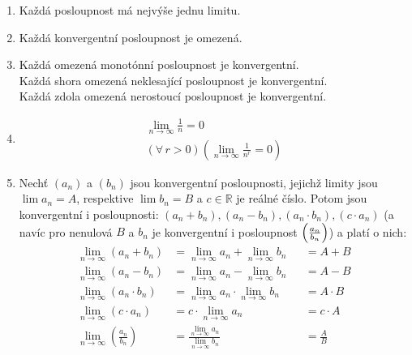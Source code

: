 \documentclass[12pt]{article}
\begin{document}
\begin{enumerate}
\item Každá posloupnost má nejvýše jednu limitu.
\item Každá konvergentní posloupnost je omezená.
\item Každá omezená monotónní posloupnost je konvergentní.\\
Každá shora omezená neklesající posloupnost je konvergentní.\\
Každá zdola omezená nerostoucí posloupnost je konvergentní.
\item
\begin{align}
\lim_{n \to \infty} \frac{1}{n} = 0\\
\left( \forall \, r>0 \right) \left( \lim_{n \to \infty} \frac{1}{n^r} = 0 \right)
\end{align}
\item Nechť $(a_n)$ a $(b_n)$ jsou konvergentní posloupnosti, jejichž limity jsou $ \lim a_n = A$, respektive $ \lim b_n = B$ a $c \in \mathbb{R}$ je reálné číslo. Potom jsou konvergentní i posloupnosti: $(a_n + b_n), (a_n - b_n), (a_n \cdot b_n), (c \cdot a_n )$  (a navíc pro nenulová $B$ a $b_n$ je konvergentní i posloupnost $\left( \small \frac{ a_n}{b_n} \right)$) a platí o nich:
\begin{align}
\lim_{n \to \infty} (a_n + b_n) &= \lim_{n \to \infty}a_n + \lim_{n \to \infty} b_n &&= A + B\\
\lim_{n \to \infty} (a_n - b_n) &= \lim_{n \to \infty}a_n - \lim_{n \to \infty} b_n &&= A - B\\
\lim_{n \to \infty} (a_n \cdot b_n) &= \lim_{n \to \infty}a_n \cdot \lim_{n \to \infty} b_n &&= A \cdot B\\
\lim_{n \to \infty} (c \cdot a_n ) &= c \cdot \lim_{n \to \infty}a_n &&= c \cdot A\\
\lim_{n \to \infty} \left(\frac{a_n}{b_n} \right) &= \frac{\lim\limits_{n \to \infty} a_n}{\lim\limits_{n \to \infty} b_n} &&=\frac{A}{B}
\end{align}
\end{enumerate}
\end{document}
